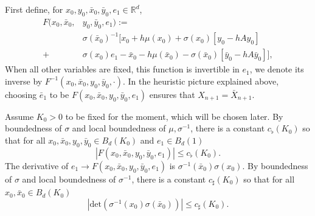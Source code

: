 \documentclass{article}
\begin{document}
First define, for  $x_{0},y_{0},\bar{x}_{0},\bar{y}_{0},e_1\in\mathbb{R}^d$,
\begin{align*}
  F(x_{0},\bar{x}_{0},&y_{0},\bar{y}_{0},e_1) :=\\
&\sigma(\bar{x}_{0})^{-1}[x_{0}+h\mu(x_{0})+\sigma(x_{0})[y_{0}-hAy_{0}]
\\
+\, &\sigma(x_{0})e_1- \bar{x}_{0}-h\mu(\bar{x}_{0})-
\sigma(\bar{x}_{0})
[\bar{y}_{0}-hA\bar{y}_{0}]],
\end{align*}
When all other variables are fixed, this function is invertible in $e_{1}$, we denote its inverse by 
$F^{-1}(x_{0},\bar{x}_{0},y_{0},\bar{y}_{0},\cdot)$.
In the heuristic picture explained above, 
choosing $\bar{e}_1$ to be $F(x_{0},\bar{x}_{0},y_{0},\bar{y}_{0},e_1)$ ensures that $X_{n+1}=\bar{X}_{n+1}$.

Assume $K_{0}>0$ to be fixed for the moment, which will be chosen later.
By boundedness of $\sigma$ and local boundedness of $\mu,\sigma^{-1}$, there is a constant $c_\flat(K_{0})$ so that for all $x_{0},\bar{x}_{0},y_{0},\bar{y}_{0}\in B_d(K_{0})$ and $e_1\in B_d(1)$
\begin{equation}\label{dor}
|F(x_{0},\bar{x}_{0},y_{0},\bar{y}_{0},e_1)|\leq c_\flat(K_{0}).
\end{equation}
The derivative of $e_1\!\to\! F(x_{0},\bar{x}_{0},y_{0},\bar{y}_{0},e_1)$ is 
$\sigma^{-1}(\bar{x}_{0})\sigma(x_{0})$.
By boundedness of $\sigma$ and local boundedness of $\sigma^{-1}$, there is a constant $c_\sharp(K_{0})$ so that for all $x_{0},\bar{x}_{0}\in B_d(K_{0})$
\begin{equation}\label{dor1}
|\mathrm{det}(\sigma^{-1}({x}_{0})\sigma(\bar{x}_{0}))|\leq c_\sharp(K_{0}).
\end{equation}
\end{document}
